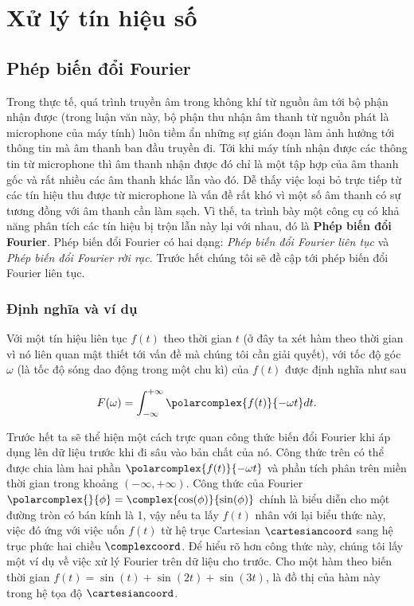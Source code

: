 \newcommand{\mathimg}[1]{parts/foundations/math/img/#1}
\setupfont{13pt}

\chapter{Xử lý tín hiệu số}	\label{chapter::signal_processing}	

\section{Phép biến đổi Fourier} \label{section::signal_processing::fourier}
	
	 Trong thực tế, quá trình truyền âm trong không khí từ nguồn âm tới bộ phận nhận được (trong luận văn này, bộ phận thu nhận âm thanh từ nguồn phát là microphone của máy tính) luôn tiềm ẩn những sự gián đoạn làm ảnh hưởng tới thông tin mà âm thanh ban đầu truyền đi. Tới khi máy tính nhận được các thông tin từ microphone thì âm thanh nhận được đó chỉ là một tập hợp của âm thanh gốc và rất nhiều các âm thanh khác lẫn vào đó. Dễ thấy việc loại bỏ trực tiếp từ các tín hiệu thu được từ microphone là vấn đề rất khó vì một số âm thanh có sự tương đồng với âm thanh cần làm sạch. Vì thế, ta trình bày một công cụ có khả năng phân tích các tín hiệu bị trộn lẫn này lại với nhau, đó là \textbf{Phép biến đổi Fourier}. Phép biến đổi Fourier có hai dạng: \textit{Phép biến đổi Fourier liên tục} và \textit{Phép biến đổi Fourier rời rạc}. Trước hết chúng tôi sẽ đề cập tới phép biến đổi Fourier liên tục.

	\subsection{Định nghĩa và ví dụ }\label{subsection::signal_processing::fourier::def}
	
		Với một tín hiệu liên tục $f(t)$ theo thời gian $t$ (ở đây ta xét hàm theo thời gian vì nó liên quan mật thiết tới vấn đề mà chúng tôi cần giải quyết),  với tốc độ góc $\omega$ (là tốc độ sóng dao động trong một chu kì) của $f(t)$ được định nghĩa như sau
		
			\begin{equation}
				F(\omega) = \int_{-\infty}^{+\infty}\polarcomplex{f(t)}{-\omega t}dt.
			\label{fourier::forward_formula}
			\end{equation}
		
		Trước hết ta sẽ thể hiện một cách trực quan công thức biến đổi Fourier khi áp dụng lên dữ liệu trước khi đi sâu vào bản chất của nó. Công thức trên có thể được chia làm hai phần $\polarcomplex{f(t)}{-\omega t}$ và phần tích phân trên miền thời gian trong khoảng $(-\infty, +\infty)$. Công thức của Fourier $\polarcomplex{}{\phi} = \complex{\cos(\phi)}{\sin(\phi)}$ chính là biểu diễn cho một đường tròn có bán kính là 1, vậy nếu ta lấy $f(t)$ nhân với lại biểu thức này, việc đó ứng với việc uốn $f(t)$ từ hệ trục Cartesian $\cartesiancoord$ sang hệ trục phức hai chiều $\complexcoord$. Để hiểu rõ hơn công thức này, chúng tôi lấy một ví dụ về việc xử lý Fourier trên dữ liệu cho trước. Cho một hàm theo biến thời gian $f(t) = \sin(t) + \sin(2t) + \sin(3t)$,  là đồ thị của hàm này trong hệ tọa độ $\cartesiancoord$.
		
